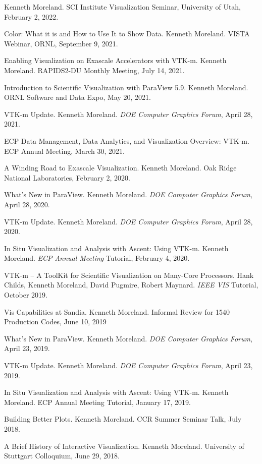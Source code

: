 \documentclass{article}
\begin{document}
\begin{enumerate}[label={[\arabic*]}]
  Kenneth Moreland.
  SCI Institute Visualization Seminar, University of Utah, February 2, 2022.
\item Color: What it is and How to Use It to Show Data.
  Kenneth Moreland.
  VISTA Webinar, ORNL, September 9, 2021.
\item Enabling Visualization on Exascale Accelerators with VTK-m.
  Kenneth Moreland.
  RAPIDS2-DU Monthly Meeting, July 14, 2021.
\item Introduction to Scientific Visualization with ParaView 5.9.
  Kenneth Moreland.
  ORNL Software and Data Expo, May 20, 2021.
\item VTK-m Update.
  Kenneth Moreland.
  \emph{DOE Computer Graphics Forum}, April 28, 2021.
\item ECP Data Management, Data Analytics, and Visualization Overview: VTK-m.
  ECP Annual Meeting, March 30, 2021.
\item A Winding Road to Exascale Visualization.
  Kenneth Moreland.
  Oak Ridge National Laboratories, February 2, 2020.
\item What's New in ParaView.
  Kenneth Moreland.
  \emph{DOE Computer Graphics Forum}, April 28, 2020.
\item VTK-m Update.
  Kenneth Moreland.
  \emph{DOE Computer Graphics Forum}, April 28, 2020.
\item In Situ Visualization and Analysis with Ascent: Using VTK-m.
  Kenneth Moreland.
  \emph{ECP Annual Meeting} Tutorial, February 4, 2020.
\item VTK-m -- A ToolKit for Scientific Visualization on Many-Core Processors.
  Hank Childs, Kenneth Moreland, David Pugmire, Robert Maynard.
  \emph{IEEE VIS} Tutorial, October 2019.
\item Vis Capabilities at Sandia.
  Kenneth Moreland.
  Informal Review for 1540 Production Codes, June 10, 2019
\item What's New in ParaView.
  Kenneth Moreland.
  \emph{DOE Computer Graphics Forum}, April 23, 2019.
\item VTK-m Update.
  Kenneth Moreland.
  \emph{DOE Computer Graphics Forum}, April 23, 2019.
\item In Situ Visualization and Analysis with Ascent: Using VTK-m.
  Kenneth Moreland.
  ECP Annual Meeting Tutorial, January 17, 2019.
\item Building Better Plots.
  Kenneth Moreland.
  CCR Summer Seminar Talk, July 2018.
\item A Brief History of Interactive Visualization.
  Kenneth Moreland.
  University of Stuttgart Colloquium, June 29, 2018.

\end{enumerate}
\end{document}
